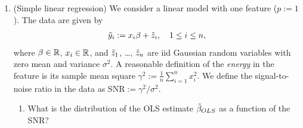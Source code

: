 \documentclass[12pt,twoside]{article}
\begin{document}
\begin{enumerate}
\begin{enumerate}
\begin{proof}
  \end{proof}
  
  \item If $x_{\op{true}}\neq 0$ prove that
    $$\frac{\|w-x_{\op{true}}\|_2}{\|x_{\op{true}}\|_2} \leq
    \kappa(A)\frac{\|z\|_2}{\|y\|_2}.$$
    Here $\kappa(A):=s_1/s_n$ is called the \textit{condition
    number} of $A$. \\

  \medskip  
  Similarly to part (b), we have 
	
	\begin{align*}
		\| A ^{-1}  A x_{\op{true}} \|_2 	&=	\|  A ^{-1} y \|_2 \\
				\|x_{\op{true}} \|_2	&=  	\|  A ^{-1} y \|_2 \\
				\|x_{\op{true}} \|_2	&\le 	\norm{A^{-1}}  \| y \|_2 \\
								&=  \frac{\| y \|_2} {s_n}	
	\end{align*}    
	So for $x_{\op{true}}\neq 0$, we now have
	\begin{align*}
		\frac{\|w-x_{\op{true}}\|_2}{\|x_{\op{true}}\|_2} 	&\leq \frac {\|z\|_2}{s_n} \; \frac{s_n} {\| y \|_2}	\\
											&\leq \frac{\|z\|_2}{s_n} \; \frac{s_1} {\| y \|_2} \text{ ~ since } s_n \le s_1 \\
											&=   \kappa(A)\frac{\|z\|_2}{\|y\|_2}
	\end{align*}   

  \end{enumerate} 
  
 \newpage
   
  \item (Simple linear regression) We consider a linear model with one feature ($p:=1$). The data are given by
\begin{align}
\tilde{  y }_i : = x_i \beta + \tilde{ z }_i, \quad 1 \leq i \leq n,
\end{align}
where $\beta \in \mathbb{R}$, $x_i \in \mathbb{R}$, and $\tilde{  z }_1$, \ldots, $\tilde{  z }_n$ are iid Gaussian random variables with zero mean and variance $\sigma^2$. A reasonable definition of the \emph{energy} in the feature is its sample mean square $\gamma^2 :=\frac{1}{n}\sum_{i=1}^{n}x_i^2$. We define the signal-to-noise ratio in the data as SNR$:= \gamma^2/\sigma^2$.
  \begin{enumerate}
  \item What is the distribution of the OLS estimate $\tilde{ \beta }_{OLS}$ as a function of the SNR?\\


\end{enumerate}
\end{enumerate}
\end{document}
